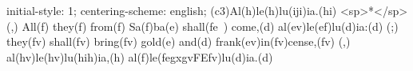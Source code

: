 initial-style: 1;
centering-scheme: english;
(c3)Al(h)le(h)lu(iji)ia.(hi) <sp>*</sp>(,) All(f) they(f) from(f) Sa(f)ba(e) shall(fe~) come,(d) al(ev)le(ef)lu(d)ia:(d) (;) they(fv) shall(fv) bring(fv) gold(e) and(d) frank(ev)in(fv)cense,(fv) (,) al(hv)le(hv)lu(hih)ia,(h) al(f)le(fegxgvFEfv)lu(d)ia.(d)
